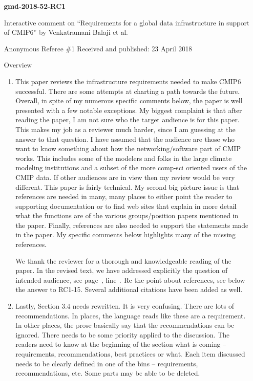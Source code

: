 \documentclass[gmd,manuscript]{copernicus}
\newcommand{\plref}[1]{see page~\pageref{p-#1}, line~\lineref{l-#1}.}
\newenvironment{answer}{\color{blue}}{}
\begin{document}
\pagebreak


\textbf{gmd-2018-52-RC1}

Interactive comment on “Requirements for a global data infrastructure
in support of CMIP6” by Venkatramani Balaji et al.

Anonymous Referee \#1
Received and published: 23 April 2018

Overview

\begin{enumerate}[label=RC1-Overview-\arabic*,leftmargin=*]
\item This paper reviews the infrastructure requirements needed to
  make CMIP6 successful. There are some attempts at charting a path
  towards the future. Overall, in spite of my numerous specific
  comments below, the paper is well presented with a few notable
  exceptions. My biggest complaint is that after reading the paper, I
  am not sure who the target audience is for this paper. This makes my
  job as a reviewer much harder, since I am guessing at the answer to
  that question. I have assumed that the audience are those who want
  to know something about how the networking/software part of CMIP
  works. This includes some of the modelers and folks in the large
  climate modeling institutions and a subset of the more comp-sci
  oriented users of the CMIP data. If other audiences are in view then
  my review would be very different. This paper is fairly technical.
  My second big picture issue is that references are needed in many,
  many places to either point the reader to supporting documentation
  or to find web sites that explain in more detail what the functions
  are of the various groups/position papers mentioned in the paper.
  Finally, references are also needed to support the statements made
  in the paper. My specific comments below highlights many of the
  missing references.

  \begin{answer}
    We thank the reviewer for a thorough and knowledgeable reading of
    the paper. In the revised text, we have addressed explicitly the
    question of intended audience, \plref{RC1-Overview-1} Re the point
    about references, see below the answer to RC1-15. Several
    additional citations have been added as well.
  \end{answer}
\item Lastly, Section 3.4 needs rewritten. It is very confusing. There
  are lots of recommendations. In places, the language reads like
  these are a requirement. In other places, the prose basically say
  that the recommendations can be ignored. There needs to be some
  priority applied to the discussion. The readers need to know at the
  beginning of the section what is coming -- requirements,
  recommendations, best practices or what. Each item discussed needs
  to be clearly defined in one of the bins -- requirements,
  recommendations, etc. Some parts may be able to be deleted.


\end{enumerate}
\end{document}
